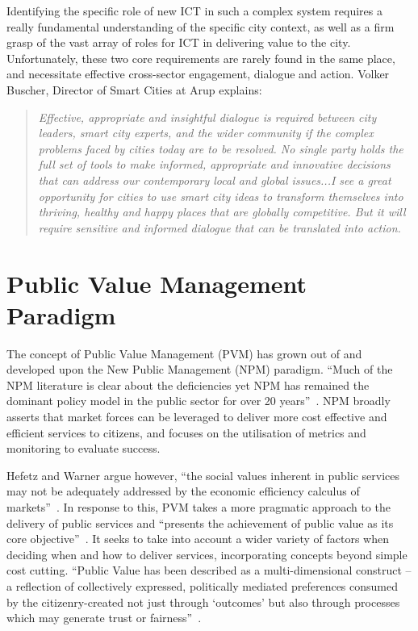 \documentclass[conference]{IEEEtran}
\begin{document}
Identifying the specific role of new ICT in such a complex system
requires a really fundamental understanding of the specific city
context, as well as a firm grasp of the vast array of roles for ICT in
delivering value to the city. Unfortunately, these two core
requirements are rarely found in the same place, and necessitate
effective cross-sector engagement, dialogue and action. Volker
Buscher, Director of Smart Cities at Arup explains:

\begin{quote}
{\emph{Effective, appropriate and insightful dialogue is required between
city leaders, smart city experts, and the wider community if the
complex problems faced by cities today are to be resolved. No single
party holds the full set of tools to make informed, appropriate and
innovative decisions that can address our contemporary local and
global issues...I see a great opportunity for cities to use smart city
ideas to transform themselves into thriving, healthy and happy places
that are globally competitive. But it will require sensitive and
informed dialogue that can be translated into action.}}~\cite{buscher:2012}
\end{quote}


\section{Public Value Management Paradigm}
The concept of Public Value Management (PVM) has grown out of and
developed upon the New Public Management (NPM) paradigm. ``Much of the
NPM literature is clear about the deficiencies yet NPM has remained
the dominant policy model in the public sector for over 20
years''~\cite{coleman:2011}.  NPM broadly asserts that market forces
can be leveraged to deliver more cost effective and efficient services
to citizens, and focuses on the utilisation of metrics and monitoring
to evaluate success.

Hefetz and Warner argue however, ``the social values inherent in
public services may not be adequately addressed by the economic
efficiency calculus of markets''~\cite{hefetz+warner:2004}. In
response to this, PVM takes a more pragmatic approach to the delivery
of public services and ``presents the achievement of public value as
its core objective''~\cite{stoker:2006}. It seeks to take into account
a wider variety of factors when deciding when and how to deliver
services, incorporating concepts beyond simple cost cutting. ``Public
Value has been described as a multi-dimensional construct -- a
reflection of collectively expressed, politically mediated preferences
consumed by the citizenry-created not just through `outcomes' but also
through processes which may generate trust or
fairness''~\cite{oflynn:2007}.
\end{document}
